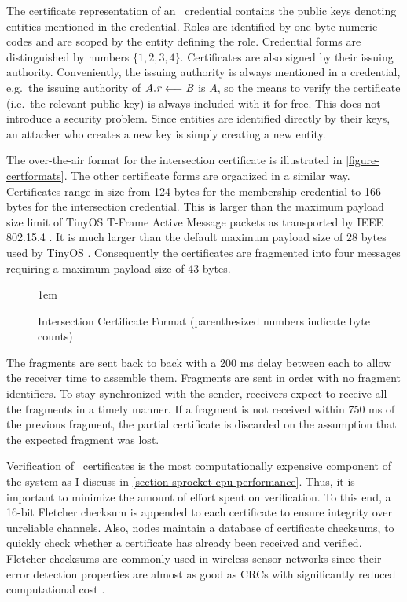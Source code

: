 The certificate representation of an \RT\ credential contains the public keys denoting entities
mentioned in the credential. Roles are identified by one byte numeric codes and are scoped by
the entity defining the role. Credential forms are distinguished by numbers $\{ 1, 2, 3, 4 \}$.
Certificates are also signed by their issuing authority. Conveniently, the issuing authority is
always mentioned in a credential, e.g.~the issuing authority of $\mathit{A.r} \stackrel{}{\longleftarrow} \mathit{B}$ is $A$, so the
means to verify the certificate (i.e.~the relevant public key) is always included with it for
free. This does not introduce a security problem. Since entities are identified directly by
their keys, an attacker who creates a new key is simply creating a new entity.

The over-the-air format for the intersection certificate is illustrated in
\autoref{figure-certformats}. The other certificate forms are organized in a similar way.
Certificates range in size from 124 bytes for the membership credential to 166 bytes for the
intersection credential. This is larger than the maximum payload size limit of TinyOS T-Frame
Active Message packets as transported by IEEE 802.15.4 \cite{802.15.4,hui-tep125}. It is much
larger than the default maximum payload size of 28 bytes used by TinyOS \cite{levis-tep111}.
Consequently the certificates are fragmented into four messages requiring a maximum payload size
of 43 bytes.

\begin{figure}[t]
  
  \centerline{\raise 1em\box\graph}
  \vspace{2mm}
  \caption{Intersection Certificate Format (parenthesized numbers indicate byte counts)}
  \label{figure-certformats}
\end{figure}

The fragments are sent back to back with a 200 ms delay between each to allow the receiver time
to assemble them. Fragments are sent in order with no fragment identifiers. To stay synchronized
with the sender, receivers expect to receive all the fragments in a timely manner. If a fragment
is not received within 750 ms of the previous fragment, the partial certificate is discarded on
the assumption that the expected fragment was lost.

Verification of \RT\ certificates is the most computationally expensive component of the system
as I discuss in \autoref{section-sprocket-cpu-performance}. Thus, it is important to minimize
the amount of effort spent on verification. To this end, a 16-bit Fletcher checksum is appended
to each certificate to ensure integrity over unreliable channels. Also, nodes maintain a
database of certificate checksums, to quickly check whether a certificate has already been
received and verified. Fletcher checksums are commonly used in wireless sensor networks since
their error detection properties are almost as good as CRCs with significantly reduced
computational cost \cite{fletcher-1982}.

